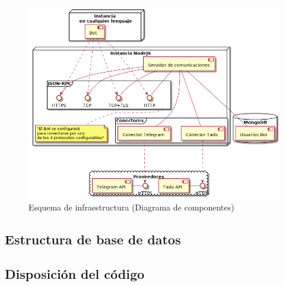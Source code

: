 \documentclass[spanish,12pt, a4paper, twoside]{paper}
\begin{document}
\begin{figure}
\centering
	\includegraphics[width=\textwidth]{recursos/component}
\caption{Esquema de infraestructura (Diagrama de componentes)}
\label{fig:Infraestructura de nodos}
\end{figure}

\subsection{Estructura de base de datos}

\subsection{Disposición del código}
\end{document}

